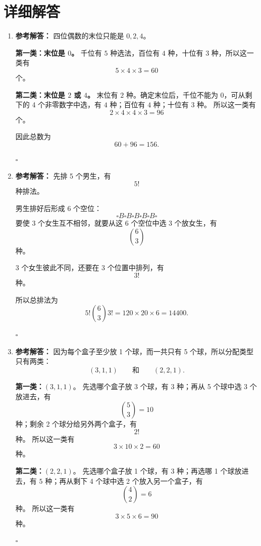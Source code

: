 \documentclass[11pt,a4paper,fontset=fandol]{ctexart}
\newenvironment{solution}{\par\noindent\textbf{参考解答：}}{\hfill$\square$\par}
\begin{document}
\newpage
\section{详细解答}

\begin{enumerate}
  \item \begin{solution}
  四位偶数的末位只能是 $0,2,4$。

  \textbf{第一类：末位是 $0$。}  
  千位有 $5$ 种选法，百位有 $4$ 种，十位有 $3$ 种，所以这一类有
  \[
  5\times 4\times 3=60
  \]
  个。

  \textbf{第二类：末位是 $2$ 或 $4$。}  
  末位有 $2$ 种。确定末位后，千位不能为 $0$，可从剩下的 4 个非零数字中选，有 $4$ 种；百位有 $4$ 种；十位有 $3$ 种。
  所以这一类有
  \[
  2\times 4\times 4\times 3=96
  \]
  个。

  因此总数为
  \[
  60+96=156.
  \]

  \end{solution}

  \item \begin{solution}
  先排 5 个男生，有
  \[
  5!
  \]
  种排法。

  男生排好后形成 6 个空位：
  \[
  \square B \square B \square B \square B \square B \square
  \]
  要使 3 个女生互不相邻，就要从这 6 个空位中选 3 个放女生，有
  \[
  \binom{6}{3}
  \]
  种。

  3 个女生彼此不同，还要在 3 个位置中排列，有
  \[
  3!
  \]
  种。

  所以总排法为
  \[
  5!\binom{6}{3}3!=120\times 20\times 6=14400.
  \]

  \end{solution}

  \item \begin{solution}
  因为每个盒子至少放 1 个球，而一共只有 5 个球，所以分配类型只有两类：
  \[
  (3,1,1)\qquad \text{和}\qquad (2,2,1).
  \]

  \textbf{第一类：}$(3,1,1)$。  
  先选哪个盒子放 3 个球，有 $3$ 种；再从 5 个球中选 3 个放进去，有
  \[
  \binom{5}{3}=10
  \]
  种；剩余 2 个球分给另外两个盒子，有
  \[
  2!
  \]
  种。
  所以这一类有
  \[
  3\times 10\times 2=60
  \]
  种。

  \textbf{第二类：}$(2,2,1)$。  
  先选哪个盒子放 1 个球，有 $3$ 种；再选哪 1 个球放进去，有 $5$ 种；再从剩下 4 个球中选 2 个放入另一个盒子，有
  \[
  \binom{4}{2}=6
  \]
  种。
  所以这一类有
  \[
  3\times 5\times 6=90
  \]
  种。


\end{solution}
\end{enumerate}
\end{document}
